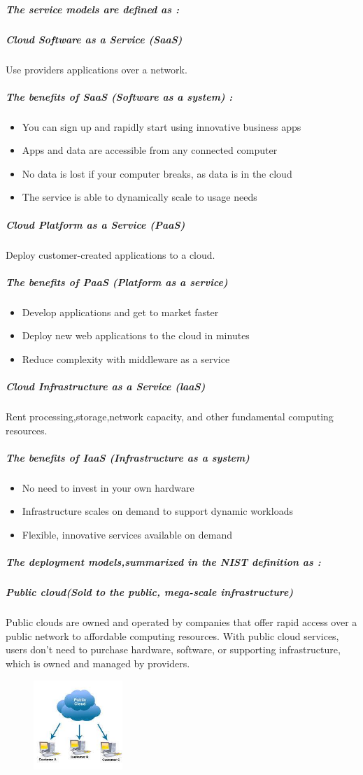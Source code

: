 \documentclass[11pt,a4paper]{report}
\begin{document}
\subparagraph*{The service models are defined as :}
\subparagraph*{Cloud Software as a Service (SaaS)} 
 Use providers applications over a network. 

\subparagraph*{The benefits of SaaS (Software as a system) :}
\begin{itemize}
\item You can sign up and rapidly start using innovative business apps
\item Apps and data are accessible from any connected computer
\item No data is lost if your computer breaks, as data is in the cloud
\item The service is able to dynamically scale to usage needs
\end{itemize}
\subparagraph*{Cloud Platform as a Service (PaaS)}
Deploy customer-created applications to a cloud.
\subparagraph{The benefits of PaaS (Platform as a service)}
\begin{itemize}
\item Develop applications and get to market faster
\item Deploy new web applications to the cloud in minutes
\item Reduce complexity with middleware as a service
\end{itemize}
\subparagraph*{Cloud Infrastructure as a Service (laaS)}
Rent processing,storage,network capacity, and other fundamental computing resources.
\subparagraph*{The benefits of IaaS (Infrastructure as a system)}
\begin{itemize}
\item No need to invest in your own hardware
\item Infrastructure scales on demand to support dynamic workloads
\item Flexible, innovative services available on demand
\end{itemize}
\subparagraph*{The deployment models,summarized in the NIST definition as : }
\subparagraph*{Public cloud(Sold to the public, mega-scale infrastructure)} 
Public clouds are owned and operated by companies that offer rapid access over a public network to affordable computing resources. With public cloud services, users don’t need to purchase hardware, software, or supporting infrastructure, which is owned and managed by providers.
\begin{figure}
\centering
\includegraphics[width=0.3\textwidth]{1.jpg}
\caption{\label{Public Cloud}  }
\end{figure}
\end{document}
